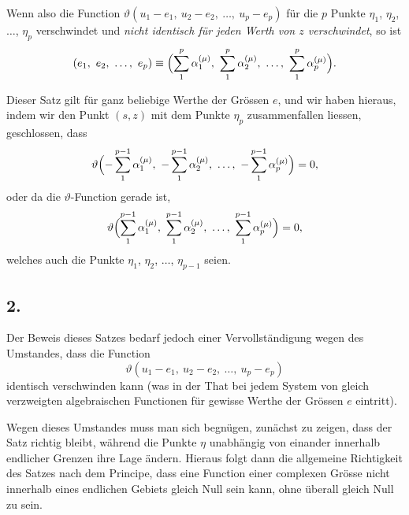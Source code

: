 \documentclass[12pt,a4paper]{book}
\theoremstyle{definition}
\theoremstyle{remark}
\begin{document}
Wenn also die Function $\vartheta(u_1-e_1,\ u_2-e_2,\ \ldots,\ u_p-e_p)$ für die $p$ Punkte $\eta_1$, $\eta_2$, $\ldots$, $\eta_p$ verschwindet und \textit{nicht identisch für jeden Werth von $z$ verschwindet}, so ist
\[ (e_1,\ e_2,\ \ldots,\ e_p) \equiv \Bigl(\sum_1^p \alpha_1^{(\mu)},\ \sum_1^p \alpha_2^{(\mu)},\ \ldots,\ \sum_1^p \alpha_p^{(\mu)}\Bigr). \]

Dieser Satz gilt für ganz beliebige Werthe der Grössen $e$, und wir haben hieraus, indem wir den Punkt $(s, z)$ mit dem Punkte $\eta_p$ zusammenfallen liessen, geschlossen, dass
\[ \vartheta\Bigl(-\sum_1^{p-1} \alpha_1^{(\mu)},\ -\sum_1^{p-1} \alpha_2^{(\mu)},\ \ldots,\ -\sum_1^{p-1} \alpha_p^{(\mu)}\Bigr) = 0, \]
oder da die $\vartheta$-Function gerade ist,
\[ \vartheta\Bigl(\sum_1^{p-1} \alpha_1^{(\mu)},\ \sum_1^{p-1} \alpha_2^{(\mu)},\ \ldots,\ \sum_1^{p-1} \alpha_p^{(\mu)}\Bigr) = 0, \]
welches auch die Punkte $\eta_1$, $\eta_2$, $\ldots$, $\eta_{p-1}$ seien.

\subsection*{2.}

Der Beweis dieses Satzes bedarf jedoch einer Vervollständigung wegen des Umstandes, dass die Function
\[ \vartheta(u_1-e_1,\ u_2-e_2,\ \ldots,\ u_p-e_p) \]
identisch verschwinden kann (was in der That bei jedem System von gleich verzweigten algebraischen Functionen für gewisse Werthe der Grössen $e$ eintritt).

Wegen dieses Umstandes muss man sich begnügen, zunächst zu zeigen, dass der Satz richtig bleibt, während die Punkte $\eta$ unabhängig von einander innerhalb endlicher Grenzen ihre Lage ändern. Hieraus folgt dann die allgemeine Richtigkeit des Satzes nach dem Principe, dass eine Function einer complexen Grösse nicht innerhalb eines endlichen Gebiets gleich Null sein kann, ohne überall gleich Null zu sein.
\end{document}
